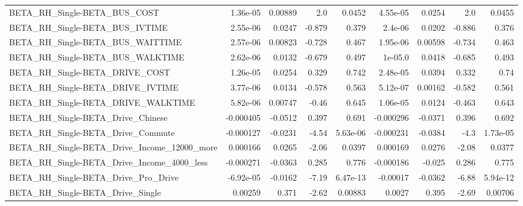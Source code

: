 \begin{tabular}{lrrrrrrrr}
BETA\_RH\_Single-BETA\_BUS\_COST                       &    1.36e-05 &      0.00889 &       2.0 &   0.0452 &   4.55e-05 &      0.0254 &          2.0 &        0.0455 \\
BETA\_RH\_Single-BETA\_BUS\_IVTIME                     &    2.55e-06 &       0.0247 &    -0.879 &    0.379 &    2.4e-06 &      0.0202 &       -0.886 &         0.376 \\
BETA\_RH\_Single-BETA\_BUS\_WAITTIME                   &    2.57e-06 &      0.00823 &    -0.728 &    0.467 &   1.95e-06 &     0.00598 &       -0.734 &         0.463 \\
BETA\_RH\_Single-BETA\_BUS\_WALKTIME                   &    2.62e-06 &       0.0132 &    -0.679 &    0.497 &    1e-05.0 &      0.0418 &       -0.685 &         0.493 \\
BETA\_RH\_Single-BETA\_DRIVE\_COST                     &    1.26e-05 &       0.0254 &     0.329 &    0.742 &   2.48e-05 &      0.0394 &        0.332 &          0.74 \\
BETA\_RH\_Single-BETA\_DRIVE\_IVTIME                   &    3.77e-06 &       0.0134 &    -0.578 &    0.563 &   5.12e-07 &     0.00162 &       -0.582 &         0.561 \\
BETA\_RH\_Single-BETA\_DRIVE\_WALKTIME                 &    5.82e-06 &      0.00747 &     -0.46 &    0.645 &   1.06e-05 &      0.0124 &       -0.463 &         0.643 \\
BETA\_RH\_Single-BETA\_Drive\_Chinese                  &   -0.000405 &      -0.0512 &     0.397 &    0.691 &  -0.000296 &     -0.0371 &        0.396 &         0.692 \\
BETA\_RH\_Single-BETA\_Drive\_Commute                  &   -0.000127 &      -0.0231 &     -4.54 & 5.63e-06 &  -0.000231 &     -0.0384 &         -4.3 &      1.73e-05 \\
BETA\_RH\_Single-BETA\_Drive\_Income\_12000\_more        &    0.000166 &       0.0265 &     -2.06 &   0.0397 &   0.000169 &      0.0276 &        -2.08 &        0.0377 \\
BETA\_RH\_Single-BETA\_Drive\_Income\_4000\_less         &   -0.000271 &      -0.0363 &     0.285 &    0.776 &  -0.000186 &      -0.025 &        0.286 &         0.775 \\
BETA\_RH\_Single-BETA\_Drive\_Pro\_Drive                &   -6.92e-05 &      -0.0162 &     -7.19 & 6.47e-13 &   -0.00017 &     -0.0362 &        -6.88 &      5.94e-12 \\
BETA\_RH\_Single-BETA\_Drive\_Single                   &     0.00259 &        0.371 &     -2.62 &  0.00883 &     0.0027 &       0.395 &        -2.69 &       0.00706 \\

\end{tabular}
